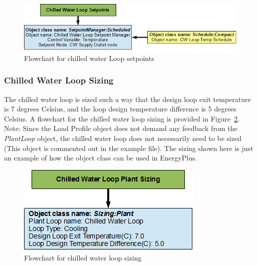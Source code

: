 \begin{figure}[htbp]
\centering
\includegraphics{media/image026.png}
\caption{Flowchart for chilled water Loop setpoints \protect \label{fig:flowchart-for-chilled-water-loop-setpoints}}
\end{figure}

\subsubsection{Chilled Water Loop Sizing}\label{chilled-water-loop-sizing}

The chilled water loop is sized such a way that the design loop exit temperature is 7 degrees Celsius, and the loop design temperature difference is 5 degrees Celsius. A flowchart for the chilled water loop sizing is provided in Figure~\ref{fig:flowchart-for-chilled-water-loop-sizing}. Note: Since the Load Profile object does not demand any feedback from the \emph{PlantLoop} object, the chilled water loop does not necessarily need to be sized (This object is commented out in the example file). The sizing shown here is just an example of how the object class can be used in EnergyPlus.

\begin{figure}[htbp]
\centering
\includegraphics{media/image027.png}
\caption{Flowchart for chilled water loop sizing \protect \label{fig:flowchart-for-chilled-water-loop-sizing}}
\end{figure}
